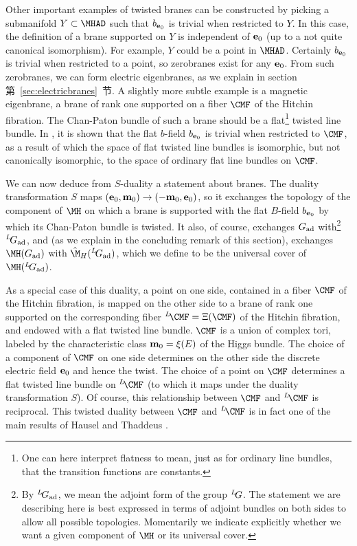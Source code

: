 Other important examples of twisted branes can be constructed by
picking  a submanifold  $Y\subset \MHAD$ such that $b_{{\bf e}_0}$
is trivial when restricted to $Y$.  In this case, the definition
of a brane supported on $Y$ is independent of ${\bf e}_0$ (up to a
not quite canonical isomorphism).  For example, $Y$ could be a
point in $\MHAD$. Certainly $b_{{\bf e}_0}$ is trivial when
restricted to a point, so zerobranes exist for any ${\bf e}_0$.
{}From such zerobranes, we can form electric eigenbranes, as we
explain in section 第~\ref{sec:electricbranes}~节. A slightly more subtle example
is a magnetic eigenbrane, a brane of rank one supported on a fiber
${\CMF}$ of the Hitchin fibration. The Chan-Paton bundle of such a
brane should be a flat\footnote{One can here interpret flatness to
mean, just as for ordinary line bundles, that the transition
functions are constants.} twisted line bundle. In \cite{ref21}, it is
shown that the flat $b$-field $b_{{\bf e}_0}$ is trivial when
restricted to ${\CMF}$, as a result of which the space of flat
twisted line bundles is isomorphic, but not canonically
isomorphic, to the space of ordinary flat line bundles on
${\CMF}$.

We can now deduce from $S$-duality a statement about branes. The
duality transformation $S$ maps $({\bf e}_0,{\bf m}_0)\to (-{\bf
m}_0,{\bf e}_0)$, so it exchanges the topology of the component of
$\MH$ on which a brane is supported with the flat $B$-field
$b_{{\bf e}_0}$ by which its Chan-Paton bundle is twisted. It
also, of course, exchanges $G_{\rm ad}$ with\footnote{By
$^L\negthinspace G_{\rm ad}$, we mean the adjoint form of the
group $^L\negthinspace G$. The statement we are describing here is
best expressed in terms of adjoint bundles on both sides to allow
all possible topologies. Momentarily we indicate explicitly
whether we want a given component of $\MH$ or its universal
cover.} $^L\negthinspace G_{{\rm ad}}$, and (as we explain in the
concluding remark of this section), exchanges $\MH(G_{{\rm ad}})$
with $\hat\M_H({}^L\negthinspace G_{{\rm ad}})$, which we define
to be the universal cover of $\MH({}^L\negthinspace G_{{\rm
ad}})$.

As a special case of this duality, a point on one side, contained
in a fiber $\CMF$ of the Hitchin fibration, is mapped on the other
side to a brane of rank one supported on the corresponding fiber
$^L\negthinspace\CMF=\Xi(\CMF)$ of the Hitchin fibration, and
endowed with a flat twisted line bundle. $\CMF$ is a union of
complex tori, labeled by the characteristic class ${\bf
m}_0=\xi(E)$ of the Higgs bundle. The choice of a component of
$\CMF$ on one side determines on the other side  the discrete
electric field ${\bf e}_0$ and hence the twist. The choice of a
point on $\CMF$ determines a flat twisted line bundle on
$^L\negthinspace\CMF$ (to which it maps under the duality
transformation $S$). Of course, this relationship between $\CMF$
and $^L\negthinspace\CMF$ is reciprocal.  This twisted duality
between $\CMF$ and $^L\negthinspace\CMF$ is in fact one of the
main results of Hausel and Thaddeus \cite{ref21}.

